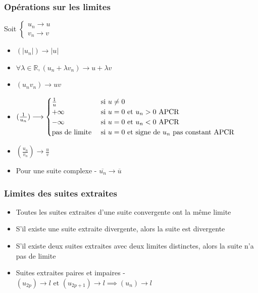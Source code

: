 \documentclass[openany]{book}
\begin{document}
\subsubsection{Opérations sur les limites}
Soit $\begin{cases}
    u_n \longrightarrow u  \\ 
    v_n \longrightarrow v
\end{cases}$
\begin{itemize}
    \item $(|u_n|) \longrightarrow |u|$
    \item $ \forall \lambda \in \mathbb{R}, (u_n + \lambda v_n) \longrightarrow u + \lambda v $
    \item $ (u_n v_n) \longrightarrow uv $
    \item $ (\frac{1}{u_n}) \longrightarrow \begin{cases}
        \frac{1}{u} & \text{ si } u \neq 0 \\
        +\infty & \text{ si } u = 0 \text{ et } u_n > 0 \text{ APCR} \\
        -\infty & \text{ si } u = 0 \text{ et } u_n < 0 \text{ APCR} \\
        \text{pas de limite} & \text{ si } u = 0 \text{ et } \text{signe de $u_n$ pas constant APCR}
    \end{cases}$
    \item $ (\frac{u_n}{v_n}) \longrightarrow \frac{u}{v} $
    \item Pour une suite complexe - $\overline{u_n} \longrightarrow \overline{u}$
\end{itemize}

\subsubsection{Limites des suites extraites}
\begin{itemize}
    \item Toutes les suites extraites d'une suite convergente ont la même limite
    \item S'il existe une suite extraite divergente, alors la suite est divergente
    \item S'il existe deux suites extraites avec deux limites distinctes, alors la suite n'a pas de limite
    \item Suites extraites paires et impaires - $ (u_{2p}) \longrightarrow l \text{ et } (u_{2p+1}) \longrightarrow l \implies (u_n) \longrightarrow l $
\end{itemize}
\end{document}
